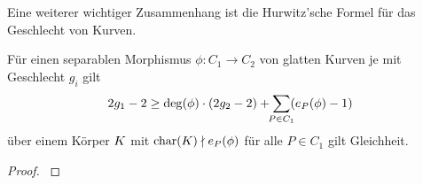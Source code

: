   Eine weiterer wichtiger Zusammenhang ist die Hurwitz'sche Formel für
  das Geschlecht von Kurven.

  \begin{Satz}[Hurwitz]\label{hurwitz}
    Für einen separablen Morphismus $\phi\colon C_1\to C_2$ von
    glatten Kurven 
    je mit Geschlecht $g_i$ gilt
    \begin{gather*}
      2g_1-2
      \geq
      \deg(\phi)\cdot(2g_2-2) + \sum_{\mathclap{P\in C_1}}(e_P(\phi)-1)
    \end{gather*}
    über einem Körper $K$ mit 
    $\operatorname{char}(K)\nmid e_P(\phi)$ für alle $P\in C_1$ 
    gilt Gleichheit.
    \begin{proof}
      \cite[siehe][Theorem II.5.9]{silverman}
    \end{proof}
  \end{Satz}


